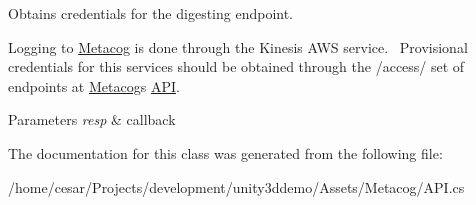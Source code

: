 Obtains credentials for the digesting endpoint. 

Logging to \hyperlink{classMetacogSDK_1_1Metacog}{Metacog} is done through the Kinesis A\+WS service.~\newline
 Provisional credentials for this services should be obtained through the /access/ set of endpoints at \hyperlink{classMetacogSDK_1_1Metacog}{Metacog}\textquotesingle{}s \hyperlink{classMetacogSDK_1_1API}{A\+PI}. ~\newline
 


\begin{DoxyParams}{Parameters}
{\em resp} & callback\\
\hline
\end{DoxyParams}


The documentation for this class was generated from the following file\+:\begin{DoxyCompactItemize}
\item 
/home/cesar/\+Projects/development/unity3ddemo/\+Assets/\+Metacog/A\+P\+I.\+cs\end{DoxyCompactItemize}
